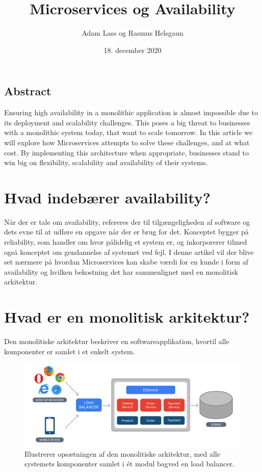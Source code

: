 \documentclass{article}
\title{Microservices og Availability}
\author{Adam Lass og Rasmus Helsgaun}
\date{18. december 2020}
\begin{document}
\maketitle
\begin{flushleft}
\subsection*{Abstract}
Ensuring high availability in a monolithic application is almost impossible due to its deployment and scalability challenges. This poses a big threat to businesses with a monolithic system today, that want to scale tomorrow. In this article we will explore how Microservices attempts to solve these challenges, and at what cost. By implementing this architecture when appropriate, businesses stand to win big on flexibility, scalability and availability of their systems.

\section*{Hvad indebærer availability?}
Når der er tale om availability, refereres der til tilgængeligheden af software og dets evne til at udføre en opgave når der er brug for det. Konceptet bygger på reliability, som handler om hvor pålidelig et system er, og inkorporerer tilmed også konceptet om gendannelse af systemet ved fejl. I denne artikel vil der blive set nærmere på hvordan Microservices kan skabe værdi for en kunde i form af availability og hvilken bekostning det har sammenlignet med en monolitisk arkitektur.

\section*{Hvad er en monolitisk arkitektur?}
Den monolitiske arkitektur beskriver en softwareapplikation, hvortil alle komponenter er samlet i et enkelt system. \linebreak

\begin{figure}[H]
    \captionsetup{justification=raggedright,singlelinecheck=false}
    \includegraphics[width=\textwidth]{monolithic load balance.jpeg}
    \caption{Illustrerer opsætningen af den monolitiske arkitektur, med alle systemets komponenter samlet i ét modul bagved en load balancer.\cite{mono2} \label{figure:mono load balance}}
\end{figure}


\end{flushleft}
\end{document}
